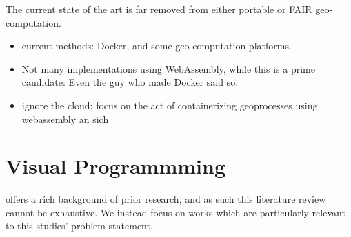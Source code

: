 The current state of the art is far removed from either portable or FAIR geo-computation. 
\begin{itemize}
  \item current methods: Docker, and some geo-computation platforms.
  \item Not many implementations using WebAssembly, while this is a prime candidate: Even the guy who made Docker said so. 
  \item ignore the cloud: focus on the act of containerizing geoprocesses using webassembly an sich
\end{itemize}


\section{Visual Programmming}
\label{sec:background-vpl}


offers a rich background of prior research, and as such this literature review cannot be exhaustive. 
We instead focus on works which are particularly relevant to this studies' problem statement.

